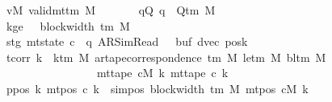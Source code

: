 \begin{isabellebody}
\ \ \ \ \ \ \ vM{\isacharcolon}{\kern0pt}\ {\isachardoublequoteopen}valid{\isacharunderscore}{\kern0pt}mttm\ M{\isachardoublequoteclose}\isanewline
\ \ \ \ \ \ \ qQ{\isacharcolon}{\kern0pt}\ {\isachardoublequoteopen}q\ {\isasymin}\ Q{\isacharunderscore}{\kern0pt}tm\ M{\isachardoublequoteclose}\isanewline
\ \ \ \ \ \ \ kge{}{\isacharcolon}{\kern0pt}\ {\isachardoublequoteopen}{}\ {\isasymle}\ block{\isacharunderscore}{\kern0pt}width\ {\isacharparenleft}{\kern0pt}{\isasymGamma}{\isacharunderscore}{\kern0pt}tm\ M{\isacharparenright}{\kern0pt}{\isachardoublequoteclose}\isanewline
\ \ \ \ \ \ \ stg{}{\isacharcolon}{\kern0pt}\ {\isachardoublequoteopen}mt{\isacharunderscore}{\kern0pt}state\ c{}\ {\isacharequal}{\kern0pt}\ {\isacharparenleft}{\kern0pt}q{\isacharcomma}{\kern0pt}\ AR{\isacharunderscore}{\kern0pt}SimRead{\isacharcomma}{\kern0pt}\ {}{\isacharcomma}{\kern0pt}\ {}{\isacharcomma}{\kern0pt}\ buf{}{\isacharcomma}{\kern0pt}\ dvec{\isacharcomma}{\kern0pt}\ posk{}{\isacharparenright}{\kern0pt}{\isachardoublequoteclose}\isanewline
\ \ \ \ \ \ \ tcorr{\isacharcolon}{\kern0pt}\ {\isachardoublequoteopen}{\isasymforall}k\ {\isacharless}{\kern0pt}\ k{\isacharunderscore}{\kern0pt}tm\ M{\isachardot}{\kern0pt}\ ar{\isacharunderscore}{\kern0pt}tape{\isacharunderscore}{\kern0pt}correspondence\ {\isacharparenleft}{\kern0pt}{\isasymGamma}{\isacharunderscore}{\kern0pt}tm\ M{\isacharparenright}{\kern0pt}\ {\isacharparenleft}{\kern0pt}le{\isacharunderscore}{\kern0pt}tm\ M{\isacharparenright}{\kern0pt}\ {\isacharparenleft}{\kern0pt}bl{\isacharunderscore}{\kern0pt}tm\ M{\isacharparenright}{\kern0pt}\isanewline
\ \ \ \ \ \ \ \ \ \ \ \ \ \ \ \ \ \ \ \ \ \ \ {\isacharparenleft}{\kern0pt}mt{\isacharunderscore}{\kern0pt}tape\ cM\ k{\isacharparenright}{\kern0pt}\ {\isacharparenleft}{\kern0pt}mt{\isacharunderscore}{\kern0pt}tape\ c{}\ k{\isacharparenright}{\kern0pt}{\isachardoublequoteclose}\isanewline
\ \ \ \ \ \ \ ppos{\isacharcolon}{\kern0pt}\ {\isachardoublequoteopen}{\isasymAnd}k{\isachardot}{\kern0pt}\ mt{\isacharunderscore}{\kern0pt}pos\ c{}\ k\ {\isacharequal}{\kern0pt}\ sim{\isacharunderscore}{\kern0pt}pos\ {\isacharparenleft}{\kern0pt}block{\isacharunderscore}{\kern0pt}width\ {\isacharparenleft}{\kern0pt}{\isasymGamma}{\isacharunderscore}{\kern0pt}tm\ M{\isacharparenright}{\kern0pt}{\isacharparenright}{\kern0pt}\ {\isacharparenleft}{\kern0pt}mt{\isacharunderscore}{\kern0pt}pos\ cM\ k{\isacharparenright}{\kern0pt}{\isachardoublequoteclose}\isanewline

\end{isabellebody}
